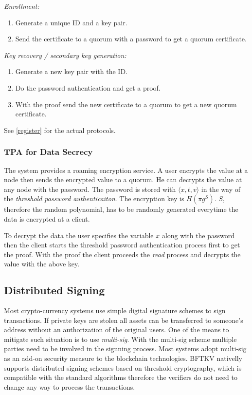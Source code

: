 \noindent
{\em Enrollment:}
\begin{enumerate}
\item Generate a unique ID and a key pair.
\item Send the certificate to a quorum with a password to get a
  quorum certificate.
\end{enumerate}

\noindent
{\em Key recovery / secondary key generation:}
\begin{enumerate}
\item Generate a new key pair with the ID.
\item Do the password authentication and get a proof.
\item With the proof send the new certificate to a quorum to get a new
  quorum certificate.
\end{enumerate}
\ifdefined\ABSTRACT
\else
See \ref{register} for the actual protocols.
\fi


\subsubsection*{TPA for Data Secrecy}
The system provides a roaming encryption service. A user encrypts
the value at a node then sends the encrypted value to a quorum. He can
decrypts the value at any node with the password. The password is
stored with $\langle x, t, v \rangle$ in the way of the {\em threshold
password authenticaiton}. The encryption key is $H(\pi g^S)$. $S$,
therefore the random polynomial, has to be randomly generated
everytime the data is encrypted at a client.

To decrypt the data the user specifies the variable $x$ along with the
password then the client starts the threshold password authentication
process first to get the proof. With the proof the client proceeds the
{\em read} process and decrypts the value with the above key.

\subsection{Distributed Signing}
Most crypto-currency systems use simple digital signature schemes to
sign transactions. If private keys are stolen all assets can be
transferred to someone's address without an authorization of the
original users. One of the means to mitigate such situation is to use
{\em multi-sig}. With the multi-sig scheme multiple parties need to be
involved in the signning process. Most systems adopt multi-sig as an
add-on security measure to the blockchain technologies. BFTKV
nativelly supports distributed signing schemes based on threshold
cryptography, which is compatible with the standard algorithms
therefore the verifiers do not need to change any way to process the
transactions.

